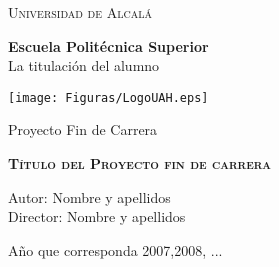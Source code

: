 \setcounter{page}{0}

\begin{center}
\LARGE \textsc{Universidad de Alcalá}\\
\vspace{0.5cm}

\textbf{Escuela Politécnica Superior}\\

La titulación del alumno\\
\end{center}

\vspace{0.5cm}


\begin{center}
\texttt{[image: Figuras/LogoUAH.eps]}
\end{center}


\begin{center}
\vspace{1cm}

\LARGE Proyecto Fin de Carrera\\

\vspace{0.5cm}

\textbf{\Huge \textsc{{Título del Proyecto fin de carrera}}}\\

\vspace{1.5cm}

\large Autor: Nombre y apellidos\\
Director: Nombre y apellidos\\

\vspace{1.5cm}

\large Año que corresponda 2007,2008, ...\\
\end{center}


